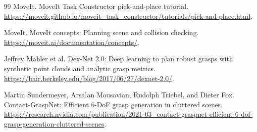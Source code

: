 \documentclass{article}
\begin{document}
\begin{thebibliography}{99}
MoveIt.
\newblock MoveIt Task Constructor pick-and-place tutorial.
\newblock \url{https://moveit.github.io/moveit_task_constructor/tutorials/pick-and-place.html}.

MoveIt.
\newblock MoveIt concepts: Planning scene and collision checking.
\newblock \url{https://moveit.ai/documentation/concepts/}.

Jeffrey Mahler et al.
\newblock Dex-Net 2.0: Deep learning to plan robust grasps with synthetic point clouds and analytic grasp metrics.
\newblock \url{https://bair.berkeley.edu/blog/2017/06/27/dexnet-2.0/}.

Martin Sundermeyer, Arsalan Mousavian, Rudolph Triebel, and Dieter Fox.
\newblock Contact-GraspNet: Efficient 6-DoF grasp generation in cluttered scenes.
\newblock \url{https://research.nvidia.com/publication/2021-03_contact-graspnet-efficient-6-dof-grasp-generation-cluttered-scenes}.

\end{thebibliography}
\end{document}
